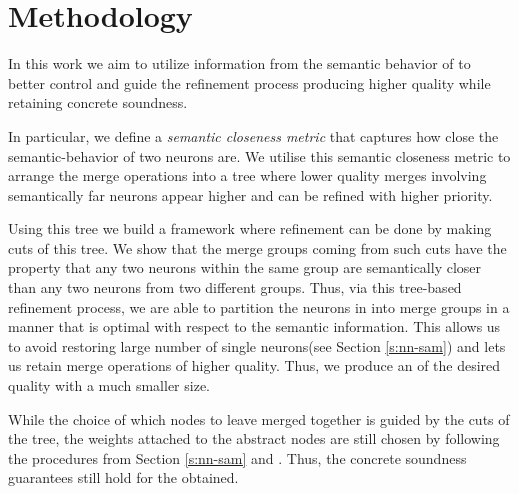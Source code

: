 \section{Methodology}
\label{s:semantic-closeness}




 
In this work we aim to utilize information from the semantic behavior of \cnc to
better control and guide the refinement process producing higher quality \abs
while retaining concrete soundness. 

In particular, we define a \textit{semantic
closeness metric} that captures how close the semantic-behavior of two 
neurons are. We utilise this semantic closeness metric to arrange the merge
operations into a tree where lower quality merges involving semantically far
neurons appear higher and can be refined with higher priority. 

Using this tree we build a framework  where refinement can
be done by making cuts of this tree. We show that the merge groups coming from
such cuts have the property that any two neurons within the same group are 
semantically closer than any two neurons from two different groups. Thus, via
this tree-based refinement process, we are able to partition the neurons in \cnc
into merge groups in a manner that is
optimal with respect to the semantic information.
This allows us to avoid restoring large number of single neurons(see Section
\ref{s:nn-sam}) and lets us retain merge operations of higher quality. Thus, we
produce an \abs of the desired quality with a much smaller size. 

While the choice of which nodes to leave merged together is guided by the cuts
of the tree, the weights attached to the abstract nodes are still chosen
by following the procedures from Section \ref{s:nn-sam} and \cite{cegar-nn}.
Thus, the concrete soundness guarantees still hold for the \abs obtained.

